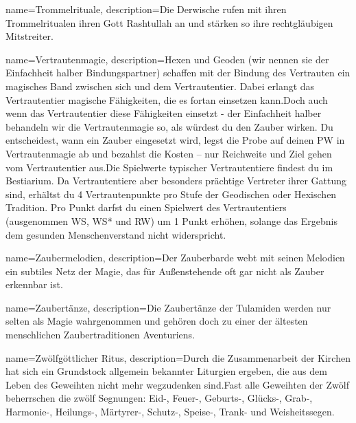 {
    name={Trommelrituale},
    description={Die Derwische rufen mit ihren Trommelritualen ihren Gott Rashtullah an und stärken so ihre rechtgläubigen Mitstreiter.}
}


{
    name={Vertrautenmagie},
    description={Hexen und Geoden (wir nennen sie der Einfachheit halber Bindungspartner) schaffen mit der Bindung des Vertrauten ein magisches Band zwischen sich und dem Vertrautentier. Dabei erlangt das Vertrautentier magische Fähigkeiten, die es fortan einsetzen kann.\newline Doch auch wenn das Vertrautentier diese Fähigkeiten einsetzt - der Einfachheit halber behandeln wir die Vertrautenmagie so, als würdest du den Zauber wirken. Du entscheidest, wann ein Zauber eingesetzt wird, legst die Probe auf deinen PW in Vertrautenmagie ab und bezahlst die Kosten – nur Reichweite und Ziel gehen vom Vertrautentier aus.\newline Die Spielwerte typischer Vertrautentiere findest du im Bestiarium. Da Vertrautentiere aber besonders prächtige Vertreter ihrer Gattung sind, erhältst du 4 Vertrautenpunkte pro Stufe der Geodischen oder Hexischen Tradition. Pro Punkt darfst du einen Spielwert des Vertrautentiers (ausgenommen WS, WS* und RW) um 1 Punkt erhöhen, solange das Ergebnis dem gesunden Menschenverstand nicht widerspricht.}
}


{
    name={Zaubermelodien},
    description={Der Zauberbarde webt mit seinen Melodien ein subtiles Netz der Magie, das für Außenstehende oft gar nicht als Zauber erkennbar ist.}
}


{
    name={Zaubertänze},
    description={Die Zaubertänze der Tulamiden werden nur selten als Magie wahrgenommen und gehören doch zu einer der ältesten menschlichen Zaubertraditionen Aventuriens.}
}


{
    name={Zwölfgöttlicher Ritus},
    description={Durch die Zusammenarbeit der Kirchen hat sich ein Grundstock allgemein bekannter Liturgien ergeben, die aus dem Leben des Geweihten nicht mehr wegzudenken sind.\newline Fast alle Geweihten der Zwölf beherrschen die zwölf Segnungen: Eid-, Feuer-, Geburts-, Glücks-, Grab-, Harmonie-, Heilungs-, Märtyrer-, Schutz-, Speise-, Trank- und Weisheitssegen.}
}


